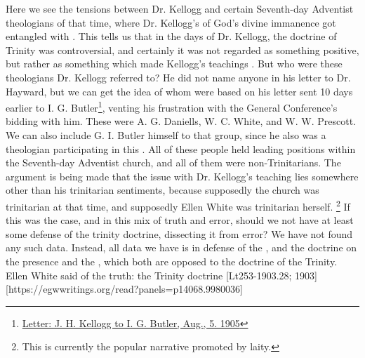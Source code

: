 Here we see the tensions between Dr. Kellogg and certain Seventh-day Adventist theologians of that time, where Dr. Kellogg's  of God's divine immanence got entangled with . This tells us that in the days of Dr. Kellogg, the doctrine of Trinity was controversial, and certainly it was not regarded as something positive, but rather as something which made Kellogg's teachings . But who were these theologians Dr. Kellogg referred to? He did not name anyone in his letter to Dr. Hayward, but we can get the idea of whom  were based on his letter sent 10 days earlier to I. G. Butler\footnote{\href{https://forgotten-pillar.s3.us-east-2.amazonaws.com/1905-08-05-kellogg-butler.pdf}{Letter: J. H. Kellogg to I. G. Butler, Aug., 5. 1905}}, venting his frustration with the General Conference's bidding with him. These were A. G. Daniells, W. C. White, and W. W. Prescott. We can also include G. I. Butler himself to that group, since he also was a theologian participating in this . All of these people held leading positions within the Seventh-day Adventist church, and all of them were non-Trinitarians. The argument is being made that the issue with Dr. Kellogg's teaching lies somewhere other than his trinitarian sentiments, because supposedly the church was trinitarian at that time, and supposedly Ellen White was trinitarian herself. \footnote{This is currently the popular narrative promoted by laity.} If this was the case, and in this mix of truth and error, should we not have at least some defense of the trinity doctrine, dissecting it from error? We have not found any such data. Instead, all data we have is in defense of the , and the doctrine on the presence and the , which both are opposed to the doctrine of the Trinity. Ellen White said of the truth: the Trinity doctrine [Lt253-1903.28; 1903][https://egwwritings.org/read?panels=p14068.9980036]


